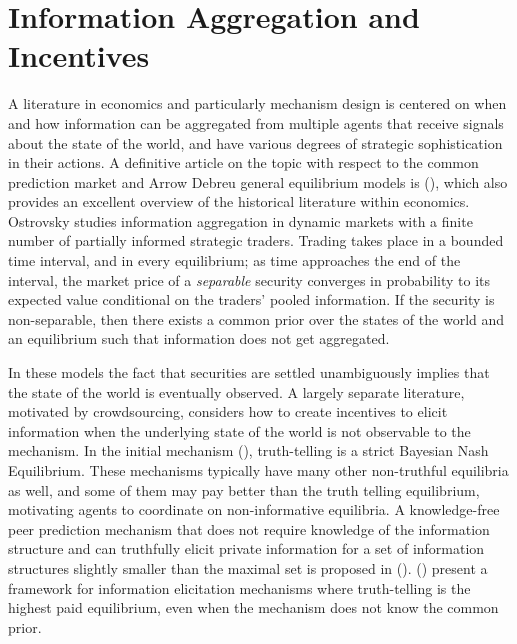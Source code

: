 \section{Information Aggregation and Incentives}



A literature in economics and particularly mechanism design is centered on when and how information can be aggregated from multiple agents that receive signals about the state of the world, and have various degrees of strategic sophistication in their actions.
A definitive article on the topic with respect to the common prediction market and Arrow Debreu general equilibrium models is (\cite{ostrovsky2012information}), which also provides an excellent overview of the historical literature within economics.
Ostrovsky studies information aggregation in dynamic markets with a finite number of partially informed strategic traders. 
Trading takes place in a bounded time interval, and in every equilibrium; as time approaches the end of the interval, the market price of a \emph{separable} security converges in probability to its expected value conditional on the traders' pooled information. If the security is non-separable, then there exists a common prior over the states of the world and an equilibrium such that information does not get aggregated. 


In these models the fact that securities are settled unambiguously implies that the state of the world is eventually observed.
A largely separate literature, motivated by crowdsourcing, considers how to create incentives to elicit information when the underlying state of the world is not observable to the mechanism. 
In the initial mechanism (\cite{prelec2004bayesian,miller2005eliciting}), truth-telling is a strict Bayesian Nash Equilibrium. These mechanisms typically have many other non-truthful equilibria as well, and some of them may pay better than the truth telling equilibrium, motivating agents to coordinate on non-informative equilibria.
A knowledge-free peer prediction mechanism that does not require knowledge of the information structure and can truthfully elicit private information for a set of information structures slightly smaller than the maximal set is proposed in (\cite{zhang2014elicitability}).
(\cite{kong2016framework}) present a framework for information elicitation mechanisms where truth-telling is the highest paid equilibrium, even when the mechanism does not know the common prior.






